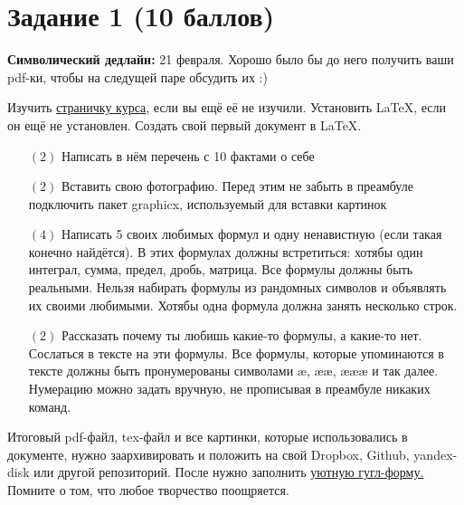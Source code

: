 \documentclass[12pt, a4paper, oneside]{article}
\begin{document}
\section*{Задание 1  (10 баллов)}

\textbf{Символический дедлайн:} 21 февраля. Хорошо было бы до него получить ваши pdf-ки, чтобы на следущей паре обсудить их :)  

Изучить \href{https://fulyankin.github.io/LaTeX/}{страничку курса}, если вы ещё её не изучили. Установить LaTeX, если он ещё не установлен. Создать свой первый документ в LaTeX.

\begin{itemize}

\item [$(2)$] Написать в нём перечень с 10 фактами о себе

\item[$(2)$] Вставить свою фотографию. Перед этим не забыть в преамбуле подключить пакет graphicx, используемый для вставки картинок

\item[$(4)$] Написать 5 своих любимых формул и одну ненавистную (если такая конечно найдётся). В этих формулах должны встретиться: хотябы один интеграл, сумма, предел, дробь, матрица. Все формулы должны быть реальными. Нельзя набирать формулы из рандомных символов и объявлять их своими любимыми. Хотябы одна формула должна занять несколько строк. 


\item[$(2)$] Рассказать почему ты любишь какие-то формулы, а какие-то нет. Сослаться в тексте на эти формулы. Все формулы, которые упоминаются в тексте должны быть пронумерованы символами æ, ææ, æææ и так далее. Нумерацию можно задать вручную, не прописывая в преамбуле никаких команд.
\end{itemize}

Итоговый pdf-файл, tex-файл и все картинки, которые использовались в документе, нужно заархивировать и положить на свой Dropbox, Github, yandex-disk или другой репозиторий. После нужно заполнить \href{https://docs.google.com/forms/d/e/1FAIpQLSe11kxKVfv07iCL1E9yNX7ll9swKImiVwRr1H70lslGzInRSg/viewform}{уютную гугл-форму.}  Помните о том, что любое творчество поощряется. 
\end{document}
